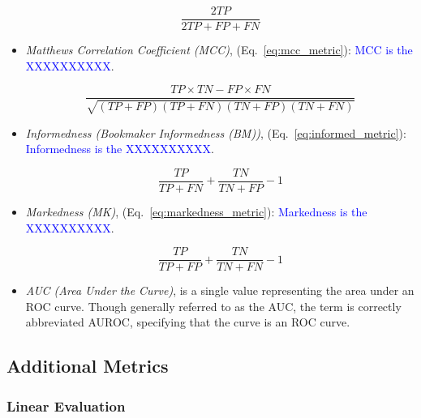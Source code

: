 \begin{itemize}
\begin{equation}
{\frac{2TP}{2TP+FP+FN}}
\label{eq:f1_metric}
\end{equation}

\item \textit{Matthews Correlation Coefficient (MCC)}, (Eq.~\ref{eq:mcc_metric}): \textcolor{blue}{MCC is the XXXXXXXXXX}.

\begin{equation}
{\frac{TP \times TN - FP \times FN}{\sqrt{(TP + FP)(TP + FN)(TN + FP)(TN + FN)}}}
\label{eq:mcc_metric}
\end{equation}

\item \textit{Informedness (Bookmaker Informedness (BM))}, (Eq.~\ref{eq:informed_metric}): \textcolor{blue}{Informedness is the XXXXXXXXXX}.

\begin{equation}
{\frac{TP}{TP+FN}+\frac{TN}{TN+FP}-1}
\label{eq:informed_metric}
\end{equation}

\item \textit{Markedness (MK)}, (Eq.~\ref{eq:markedness_metric}): \textcolor{blue}{Markedness is the XXXXXXXXXX}.

\begin{equation}
{\frac{TP}{TP+FP}+\frac{TN}{TN+FN}-1}
\label{eq:markedness_metric}
\end{equation}



\item \textit{AUC (Area Under the Curve)}, is a single value representing the area under an ROC curve. Though generally referred to as the AUC, the term is correctly abbreviated AUROC, specifying that the curve is an ROC curve.
\end{itemize}


\subsection{Additional Metrics}


\subsubsection{Linear Evaluation}

